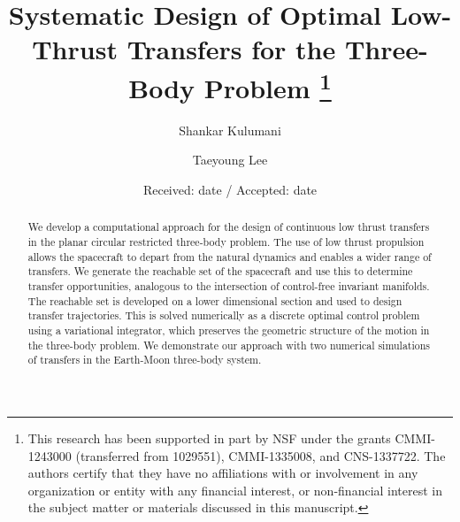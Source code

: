 \documentclass[smallcondensed]{svjour3}
\begin{document}
\title{Systematic Design of Optimal Low-Thrust Transfers for the Three-Body Problem
\thanks{This research has been supported in part by NSF under the grants CMMI-1243000 (transferred from 1029551), CMMI-1335008, and CNS-1337722.
The authors certify that they have no affiliations with or involvement in any organization or entity with any financial interest, or non-financial interest  in the subject matter or materials discussed in this manuscript.}
}

\author{Shankar Kulumani \and Taeyoung Lee}  


\date{Received: date / Accepted: date}

\maketitle{}        
\begin{abstract}
We develop a computational approach for the design of continuous low thrust transfers in the planar circular restricted three-body problem.
The use of low thrust propulsion allows the spacecraft to depart from the natural dynamics and enables a wider range of transfers.
We generate the reachable set of the spacecraft and use this to determine transfer opportunities, analogous to the intersection of control-free invariant manifolds.
The reachable set is developed on a lower dimensional \Poincare section and used to design transfer trajectories. 
This is solved numerically as a discrete optimal control problem using a variational integrator, which preserves the geometric structure of the motion in the three-body problem.
We demonstrate our approach with two numerical simulations of transfers in the Earth-Moon three-body system.
\end{abstract}
\end{document}
